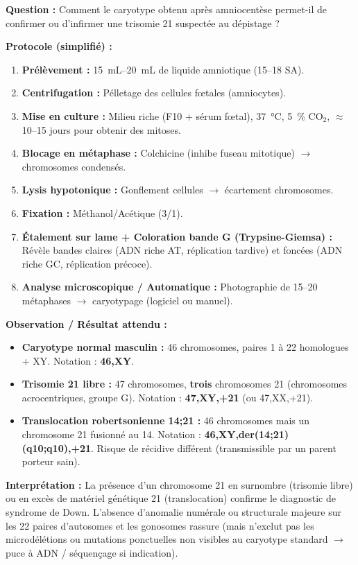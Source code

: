 \documentclass[11pt]{article}
\begin{document}
\begin{experience}
\textbf{Question :} Comment le caryotype obtenu après amniocentèse permet-il de confirmer ou d'infirmer une trisomie 21 suspectée au dépistage ?

\textbf{Protocole (simplifié) :}
\begin{enumerate}
    \item \textbf{Prélèvement :} \SI{15}{\mL}--\SI{20}{\mL} de liquide amniotique (\num{15}--\num{18} SA).
    \item \textbf{Centrifugation :} Pélletage des cellules fœtales (amniocytes).
    \item \textbf{Mise en culture :} Milieu riche (F10 + sérum fœtal), \SI{37}{\celsius}, \SI{5}{\%} CO$_2$, $\approx$ \num{10}--\num{15} jours pour obtenir des mitoses.
    \item \textbf{Blocage en métaphase :} Colchicine (inhibe fuseau mitotique) $\rightarrow$ chromosomes condensés.
    \item \textbf{Lysis hypotonique :} Gonflement cellules $\rightarrow$ écartement chromosomes.
    \item \textbf{Fixation :} Méthanol/Acétique (\num{3}/\num{1}).
    \item \textbf{Étalement sur lame + Coloration bande G (Trypsine-Giemsa) :} Révèle bandes claires (ADN riche AT, réplication tardive) et foncées (ADN riche GC, réplication précoce).
    \item \textbf{Analyse microscopique / Automatique :} Photographie de \num{15}--\num{20} métaphases $\rightarrow$ caryotypage (logiciel ou manuel).
\end{enumerate}

\textbf{Observation / Résultat attendu :}
\begin{itemize}
    \item \textbf{Caryotype normal masculin :} \num{46} chromosomes, paires 1 à 22 homologues + XY. Notation : \textbf{46,XY}.
    \item \textbf{Trisomie 21 libre :} \num{47} chromosomes, \textbf{trois} chromosomes 21 (chromosomes acrocentriques, groupe G). Notation : \textbf{47,XY,+21} (ou 47,XX,+21).
    \item \textbf{Translocation robertsonienne 14;21 :} \num{46} chromosomes mais un chromosome 21 fusionné au 14. Notation : \textbf{46,XY,der(14;21)(q10;q10),+21}. Risque de récidive différent (transmissible par un parent porteur sain).
\end{itemize}

\textbf{Interprétation :} La présence d'un chromosome 21 en surnombre (trisomie libre) ou en excès de matériel génétique 21 (translocation) confirme le diagnostic de syndrome de Down. L'absence d'anomalie numérale ou structurale majeure sur les 22 paires d'autosomes et les gonosomes rassure (mais n'exclut pas les microdélétions ou mutations ponctuelles non visibles au caryotype standard $\rightarrow$ puce à ADN / séquençage si indication).
\end{experience}
\end{document}
